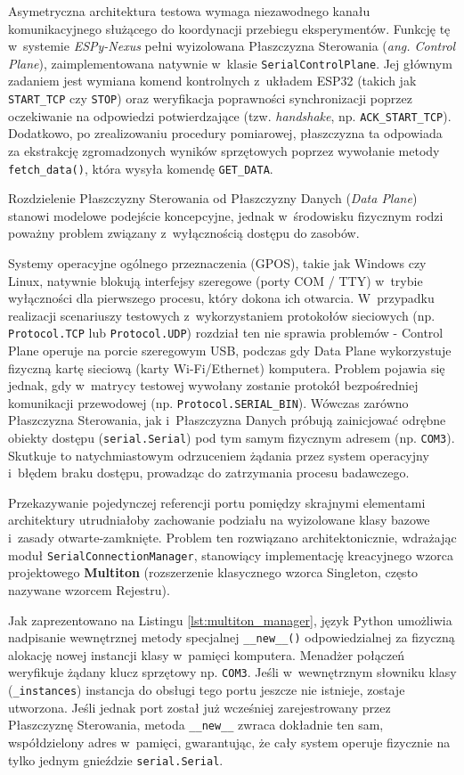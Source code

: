 Asymetryczna architektura testowa wymaga niezawodnego kanału komunikacyjnego służącego do koordynacji przebiegu eksperymentów.
Funkcję tę w~systemie \textit{ESPy-Nexus} pełni wyizolowana Płaszczyzna Sterowania (\textit{ang. Control Plane}), zaimplementowana natywnie w~klasie \texttt{SerialControlPlane}.
Jej głównym zadaniem jest wymiana komend kontrolnych z~układem ESP32 (takich jak \texttt{START\_TCP} czy \texttt{STOP}) oraz weryfikacja poprawności synchronizacji poprzez oczekiwanie na odpowiedzi potwierdzające (tzw. \textit{handshake}, np. \texttt{ACK\_START\_TCP}).
Dodatkowo, po zrealizowaniu procedury pomiarowej, płaszczyzna ta odpowiada za ekstrakcję zgromadzonych wyników sprzętowych poprzez wywołanie metody \texttt{fetch\_data()}, która wysyła komendę \texttt{GET\_DATA}.

Rozdzielenie Płaszczyzny Sterowania od Płaszczyzny Danych (\textit{Data Plane}) stanowi modelowe podejście koncepcyjne, jednak w~środowisku fizycznym rodzi poważny problem związany z~wyłącznością dostępu do zasobów.

Systemy operacyjne ogólnego przeznaczenia (GPOS), takie jak Windows czy Linux, natywnie blokują interfejsy szeregowe (porty COM / TTY) w~trybie wyłączności dla pierwszego procesu, który dokona ich otwarcia.
W~przypadku realizacji scenariuszy testowych z~wykorzystaniem protokołów sieciowych (np. \texttt{Protocol.TCP} lub \texttt{Protocol.UDP}) rozdział ten nie sprawia problemów - Control Plane operuje na porcie szeregowym USB, podczas gdy Data Plane wykorzystuje fizyczną kartę sieciową (karty Wi-Fi/Ethernet) komputera.
Problem pojawia się jednak, gdy w~matrycy testowej wywołany zostanie protokół bezpośredniej komunikacji przewodowej (np. \texttt{Protocol.SERIAL\_BIN}).
Wówczas zarówno Płaszczyzna Sterowania, jak i~Płaszczyzna Danych próbują zainicjować odrębne obiekty dostępu (\texttt{serial.Serial}) pod tym samym fizycznym adresem (np. \texttt{COM3}).
Skutkuje to natychmiastowym odrzuceniem żądania przez system operacyjny i~błędem braku dostępu, prowadząc do zatrzymania procesu badawczego.

Przekazywanie pojedynczej referencji portu pomiędzy skrajnymi elementami architektury utrudniałoby zachowanie podziału na wyizolowane klasy bazowe i~zasady otwarte-zamknięte.
Problem ten rozwiązano architektonicznie, wdrażając moduł \texttt{SerialConnectionManager}, stanowiący implementację kreacyjnego wzorca projektowego \textbf{Multiton} (rozszerzenie klasycznego wzorca Singleton, często nazywane wzorcem Rejestru).

Jak zaprezentowano na Listingu \ref{lst:multiton_manager}, język Python umożliwia nadpisanie wewnętrznej metody specjalnej \texttt{\_\_new\_\_()} odpowiedzialnej za fizyczną alokację nowej instancji klasy w~pamięci komputera.
Menadżer połączeń weryfikuje żądany klucz sprzętowy np. \texttt{COM3}.
Jeśli w~wewnętrznym słowniku klasy (\texttt{\_instances}) instancja do obsługi tego portu jeszcze nie istnieje, zostaje utworzona.
Jeśli jednak port został już wcześniej zarejestrowany przez Płaszczyznę Sterowania, metoda \texttt{\_\_new\_\_} zwraca dokładnie ten sam, współdzielony adres w~pamięci, gwarantując, że cały system operuje fizycznie na tylko jednym gnieździe \texttt{serial.Serial}.


